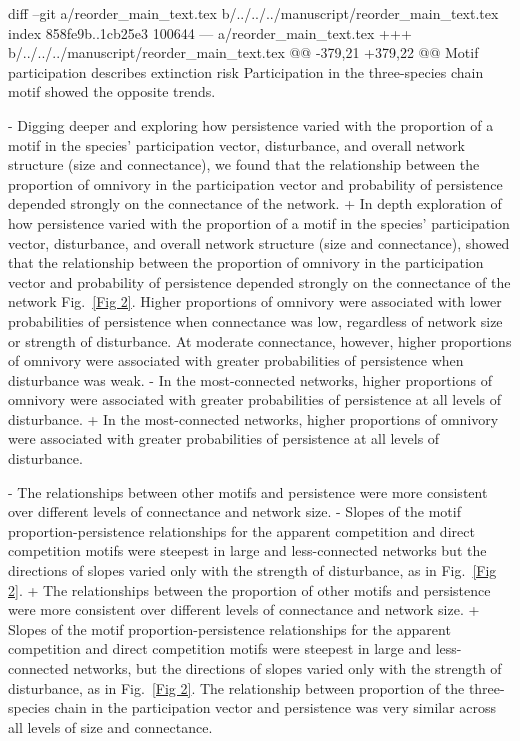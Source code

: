 diff --git a/reorder_main_text.tex b/../../../manuscript/reorder_main_text.tex
index 858fe9b..1cb25e3 100644
--- a/reorder_main_text.tex
+++ b/../../../manuscript/reorder_main_text.tex
@@ -379,21 +379,22 @@ Motif participation describes extinction risk
         Participation in the three-species chain motif showed the opposite trends.
     
 
-        Digging deeper and exploring how persistence varied with the proportion of a motif in the species' participation vector, disturbance, and overall network structure (size and connectance), we found that the relationship between the proportion of omnivory in the participation vector and probability of persistence depended strongly on the connectance of the network.
+        In depth exploration of how persistence varied with the proportion of a motif in the species' participation vector, disturbance, and overall network structure (size and connectance), showed that the relationship between the proportion of omnivory in the participation vector and probability of persistence depended strongly on the connectance of the network Fig.~\ref{Fig 2}.
         Higher proportions of omnivory were associated with lower probabilities of persistence when connectance was low, regardless of network size or strength of disturbance.
         At moderate connectance, however, higher proportions of omnivory were associated with greater probabilities of persistence when disturbance was weak.
-        In the most-connected networks, higher proportions of omnivory were associated with greater probabilities of persistence at all levels of disturbance.
+        In the most-connected networks, higher proportions of omnivory were associated with greater probabilities of persistence at all levels of disturbance. 
 
-        The relationships between other motifs and persistence were more consistent over different levels of connectance and network size.
-        Slopes of the motif proportion-persistence relationships for the apparent competition and direct competition motifs were steepest in large and less-connected networks but the directions of slopes varied only with the strength of disturbance, as in Fig.~\ref{Fig 2}.
+        The relationships between the proportion of other motifs and persistence were more consistent over different levels of connectance and network size.
+        Slopes of the motif proportion-persistence relationships for the apparent competition and direct competition motifs were steepest in large and less-connected networks, but the directions of slopes varied only with the strength of disturbance, as in Fig.~\ref{Fig 2}.
         The relationship between proportion of the three-species chain in the participation vector and persistence was very similar across all levels of size and connectance.
 
